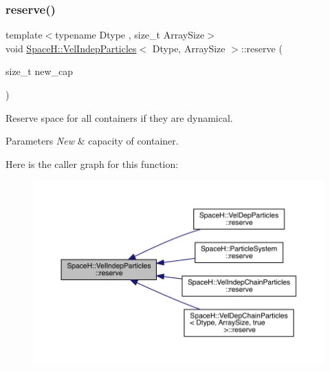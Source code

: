 \subsubsection{\texorpdfstring{reserve()}{reserve()}}
{\footnotesize\ttfamily template$<$typename Dtype , size\+\_\+t Array\+Size$>$ \\
void \mbox{\hyperlink{class_space_h_1_1_vel_indep_particles}{Space\+H\+::\+Vel\+Indep\+Particles}}$<$ Dtype, Array\+Size $>$\+::reserve (\begin{DoxyParamCaption}\item[{size\+\_\+t}]{new\+\_\+cap }\end{DoxyParamCaption})\hspace{0.3cm}{\ttfamily [inline]}}



Reserve space for all containers if they are dynamical. 


\begin{DoxyParams}{Parameters}
{\em New} & capacity of container. \\
\hline
\end{DoxyParams}
Here is the caller graph for this function\+:
\nopagebreak
\begin{figure}[H]
\begin{center}
\leavevmode
\includegraphics[width=350pt]{class_space_h_1_1_vel_indep_particles_acfc418ed2bc892b9932c606853570e77_icgraph}
\end{center}
\end{figure}
\mbox{\label{class_space_h_1_1_vel_indep_particles_a4f3fe32c740780625671b9a6a0737004}} 
